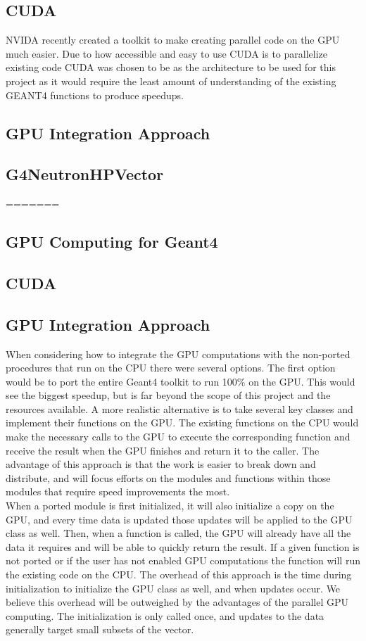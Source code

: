 \documentclass[12pt]{article}
\begin{document}
\subsection{CUDA}
NVIDA recently created a toolkit to make creating parallel code on the GPU much easier. Due to how accessible and easy to use CUDA is to parallelize existing code CUDA was chosen to be as the architecture to be used for this project as it would require the least amount of understanding of the existing GEANT4 functions to produce speedups. 
\subsection{GPU Integration Approach}
\subsection{G4NeutronHPVector}\label{subsec_G4NeutronHPVector}
=======
\subsection{GPU Computing for Geant4} %
\subsection{CUDA} %
\subsection{GPU Integration Approach} %
When considering how to integrate the GPU computations with the non-ported procedures that run on the CPU there were several options. The first option would be to port the entire Geant4 toolkit to run 100\% on the GPU. This would see the biggest speedup, but is far beyond the scope of this project and the resources available. A more realistic alternative is to take several key classes and implement their functions on the GPU. The existing functions on the CPU would make the necessary calls to the GPU to execute the corresponding function and receive the result when the GPU finishes and return it to the caller. The advantage of this approach is that the work is easier to break down and distribute, and will focus efforts on the modules and functions within those modules that require speed improvements the most.\\

When a ported module is first initialized, it will also initialize a copy on the GPU, and every time data is updated those updates will be applied to the GPU class as well. Then, when a function is called, the GPU will already have all the data it requires and will be able to quickly return the result. If a given function is not ported or if the user has not enabled GPU computations the function will run the existing code on the CPU. The overhead of this approach is the time during initialization to initialize the GPU class as well, and when updates occur. We believe this overhead will be outweighed by the advantages of the parallel GPU computing. The initialization is only called once, and updates to the data generally target small subsets of the vector.\\
\end{document}

